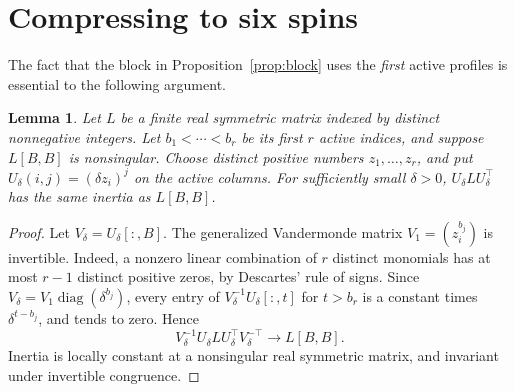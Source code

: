 \documentclass[11pt]{article}
\newtheorem{lemma}[theorem]{Lemma}
\theoremstyle{remark}\newtheorem{remark}[theorem]{Remark}
\DeclareMathOperator{\diag}{diag}
\begin{document}
\section{Compressing to six spins}

The fact that the block in Proposition~\ref{prop:block} uses the
\emph{first} active profiles is essential to the following argument.

\begin{lemma}\label{lem:compression}
Let $L$ be a finite real symmetric matrix indexed by distinct
nonnegative integers. Let $b_1<\cdots<b_r$ be its first $r$ active
indices, and suppose $L[B,B]$ is nonsingular. Choose distinct
positive numbers $z_1,\ldots,z_r$, and put
$U_\delta(i,j)=(\delta z_i)^j$ on the active columns.
For sufficiently small $\delta>0$, $U_\delta L U_\delta^\top$
has the same inertia as $L[B,B]$.
\end{lemma}
\begin{proof}
Let $V_\delta=U_\delta[:,B]$. The generalized Vandermonde matrix
$V_1=(z_i^{b_j})$ is invertible. Indeed, a nonzero linear
combination of $r$ distinct monomials has at most $r-1$ distinct
positive zeros, by Descartes' rule of signs.
Since $V_\delta=V_1\diag(\delta^{b_j})$, every entry of
$V_\delta^{-1}U_\delta[:,t]$ for $t>b_r$ is a constant times
$\delta^{t-b_j}$, and tends to zero. Hence
\[
 V_\delta^{-1}U_\delta L U_\delta^\top V_\delta^{-\top}
 \longrightarrow L[B,B].
\]
Inertia is locally constant at a nonsingular real symmetric matrix,
and invariant under invertible congruence.
\end{proof}
\end{document}
